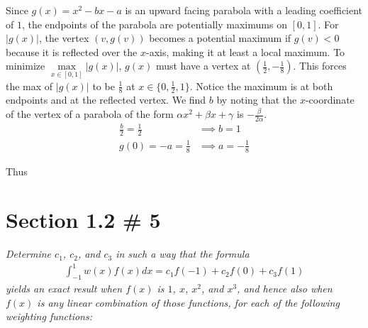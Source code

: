 \documentclass[12pt]{article}
\begin{document}
\begin{enumerate}[\ \ (a)\ \ ]
Since $g(x) = x^2 - bx - a$ is an upward facing parabola with a leading coefficient of $1$, the endpoints of the parabola are potentially maximums on $[0,1]$.  For $|g(x)|$, the vertex $(v, g(v))$ becomes a potential maximum if $g(v) < 0$ because it is reflected over the $x$-axis, making it at least a local maximum.  To minimize $\max\limits_{x\in[0,1]}|g(x)|$, $g(x)$ must have a vertex at $(\frac{1}{2}, -\frac{1}{8})$.  This forces the max of $|g(x)|$ to be $\frac{1}{8}$ at $x\in\{0, \frac{1}{2}, 1\}$.  Notice the maximum is at both endpoints and at the reflected vertex.  We find $b$ by noting that the $x$-coordinate of the vertex of a parabola of the form $\alpha x^2 + \beta x + \gamma$ is $-\frac{\beta}{2\alpha}$.
\begin{align*}
\tfrac{b}{2} = \tfrac{1}{2} &\implies b = 1 \\
g(0) = - a = \tfrac{1}{8} &\implies a = -\tfrac{1}{8}
\end{align*}

Thus 

\end{enumerate}

\section*{Section 1.2 \# 5}
{\it Determine $c_1$, $c_2$, and $c_3$ in such a way that the formula}
\begin{align*}
\int_{-1}^{1}{w(x)f(x)}dx = c_1f(-1) + c_2f(0) + c_3f(1)
\end{align*}
{\it yields an exact result when $f(x)$ is $1$, $x$, $x^2$, and $x^3$, and hence also when $f(x)$ is  any linear combination of those functions, for each of the following weighting functions:}
\end{document}
